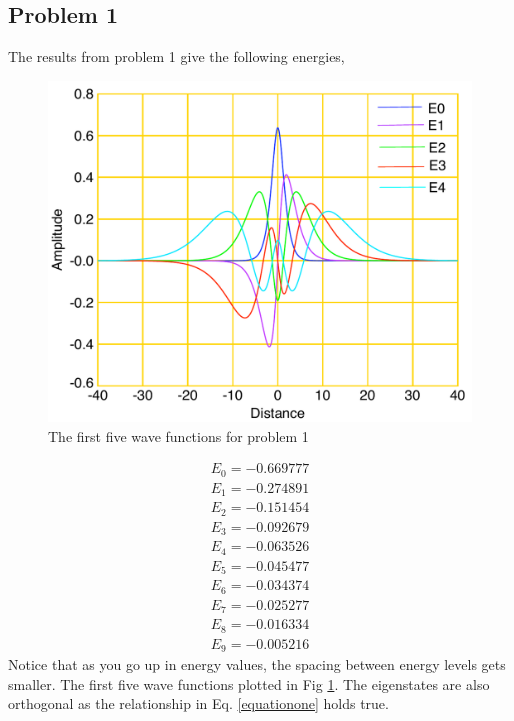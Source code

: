 \documentclass[12pt]{article}
\begin{document}
\subsection{Problem 1}
The results from problem 1 give the following energies,
\begin {figure}[!htb]
	\includegraphics[width=1.\textwidth]{question_1/plot5.pdf}
	\caption{The first five wave functions for problem 1 }
	\label{image1one}
\end {figure}  
\begin{align*}
E_0 = -0.669777 \\ 
E_1 = -0.274891 \\
E_2 = -0.151454 \\ 
E_3 = -0.092679 \\
E_4 = -0.063526 \\ 
E_5 = -0.045477 \\
E_6 = -0.034374 \\ 
E_7 = -0.025277 \\
E_8 = -0.016334 \\ 
E_9 = -0.005216
\end{align*}
Notice that as you go up in energy values, the spacing between energy levels gets smaller. The first five wave functions plotted in Fig \ref {image1one}. The eigenstates are also orthogonal as the relationship in Eq. \ref {equationone} holds true. \\
\end{document}
